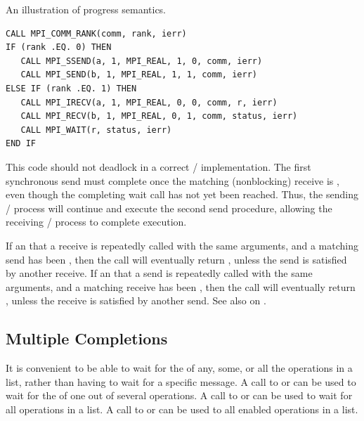 \begin{example}
\label{pt2pt-exM}
%
%
An illustration of progress semantics.
\begin{lstlisting}[language={[MPI]Fortran}]
CALL MPI_COMM_RANK(comm, rank, ierr)
IF (rank .EQ. 0) THEN
   CALL MPI_SSEND(a, 1, MPI_REAL, 1, 0, comm, ierr)
   CALL MPI_SEND(b, 1, MPI_REAL, 1, 1, comm, ierr)
ELSE IF (rank .EQ. 1) THEN
   CALL MPI_IRECV(a, 1, MPI_REAL, 0, 0, comm, r, ierr)
   CALL MPI_RECV(b, 1, MPI_REAL, 0, 1, comm, status, ierr)
   CALL MPI_WAIT(r, status, ierr)
END IF
\end{lstlisting}

This code should not deadlock in a correct \MPI/ implementation.
The first synchronous send must complete once the
matching (nonblocking) receive is , even though
the completing wait call has not yet been reached.
Thus, the sending \MPI/ process will continue and execute
the second send procedure, allowing the receiving \MPI/ process to complete execution.
\end{example}

If an  that  a receive is repeatedly called
with the same
arguments, and
a matching send has been , then the call will eventually
return , unless the send is satisfied by another
receive.
If an  that  a send is repeatedly called with the
same arguments, and
a matching receive has been , then the call will eventually
return , unless the receive is satisfied by another
send.
See also  on .

\subsection{Multiple Completions}
\label{subsec:pt2pt-multiple}

It is convenient to be able to wait for the  of any, some, or all the
operations in a list, rather than having to wait for a specific message.
A call to  or  can be used to
wait for the
 of one out of several operations. A call to 
or  can be
used to wait for all  operations in a list. A call to
 or  can be used to  all
enabled operations in a list.

